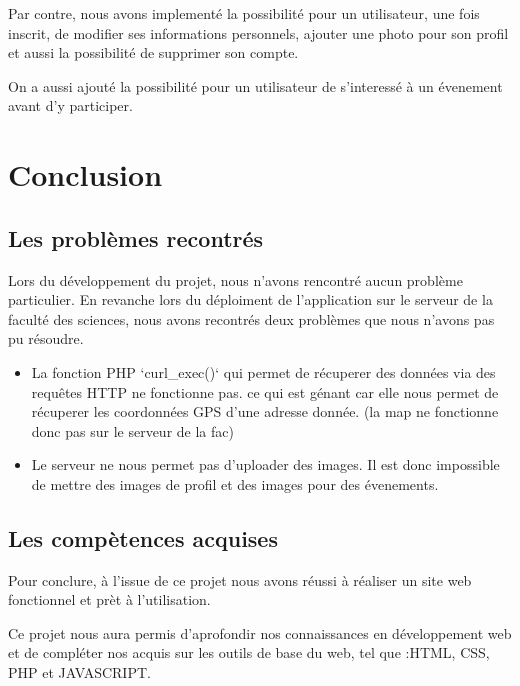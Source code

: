 \documentclass[oneside,11pt,a4paper]{article}
\begin{document}
Par contre, nous avons implementé la possibilité pour un utilisateur, une fois inscrit, de modifier ses informations personnels, ajouter une photo pour son profil et aussi la possibilité de supprimer son compte.

On a aussi ajouté la possibilité pour un utilisateur de s'interessé à un évenement avant d'y participer.

\section{Conclusion}

\subsection{Les problèmes recontrés}

Lors du développement du projet, nous n'avons rencontré aucun problème particulier. En revanche lors du déploiment de l'application sur le serveur de la faculté des sciences, nous avons recontrés deux problèmes que nous n'avons pas pu résoudre.

\begin{itemize}
	\item La fonction PHP `curl\_exec()` qui permet de récuperer des données via des requêtes HTTP ne fonctionne pas. ce qui est génant car elle nous permet de récuperer les coordonnées GPS d'une adresse donnée. (la map ne fonctionne donc pas sur le serveur de la fac)
	\item Le serveur ne nous permet pas d'uploader des images. Il est donc impossible de mettre des images de profil et des images pour des évenements.
\end{itemize}

\subsection{Les compètences acquises}

Pour conclure, à l’issue de ce projet nous avons réussi à réaliser un site web fonctionnel et prèt à l'utilisation. 

Ce projet nous aura permis d’aprofondir nos connaissances en développement web et de compléter nos acquis sur les outils de base du web, tel que :HTML, CSS, PHP et JAVASCRIPT.
\end{document}

